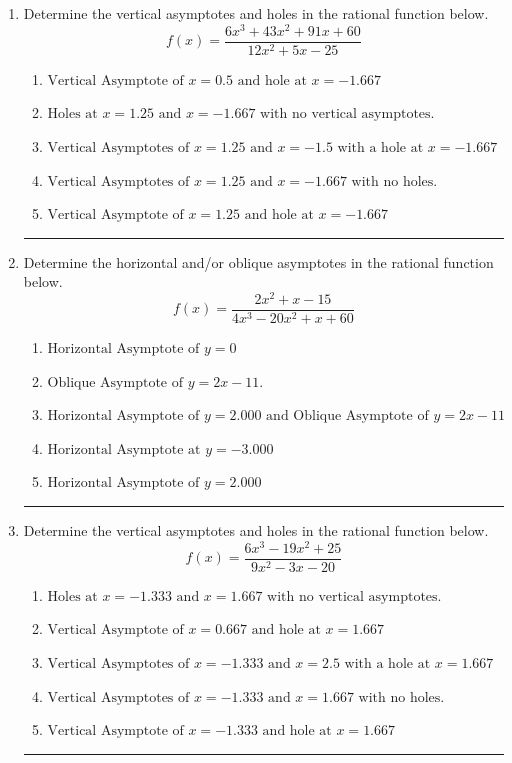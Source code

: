 \documentclass[14pt]{extbook}
\newcommand{\litem}[1]{\item#1\hspace*{-1cm}\rule{\textwidth}{0.4pt}}
\begin{document}
\begin{enumerate}
{\begin{enumerate}[label=\Alph*.]
\end{enumerate} }
\litem{
Determine the vertical asymptotes and holes in the rational function below.\[ f(x) = \frac{6x^{3} +43 x^{2} +91 x + 60}{12x^{2} +5 x -25} \]\begin{enumerate}[label=\Alph*.]
\item \( \text{Vertical Asymptote of } x = 0.5 \text{ and hole at } x = -1.667 \)
\item \( \text{Holes at } x = 1.25 \text{ and } x = -1.667 \text{ with no vertical asymptotes.} \)
\item \( \text{Vertical Asymptotes of } x = 1.25 \text{ and } x = -1.5 \text{ with a hole at } x = -1.667 \)
\item \( \text{Vertical Asymptotes of } x = 1.25 \text{ and } x = -1.667 \text{ with no holes.} \)
\item \( \text{Vertical Asymptote of } x = 1.25 \text{ and hole at } x = -1.667 \)

\end{enumerate} }
\litem{
Determine the horizontal and/or oblique asymptotes in the rational function below.\[ f(x) = \frac{2x^{2} +x -15}{4x^{3} -20 x^{2} +x + 60} \]\begin{enumerate}[label=\Alph*.]
\item \( \text{Horizontal Asymptote of } y = 0 \)
\item \( \text{Oblique Asymptote of } y = 2x -11. \)
\item \( \text{Horizontal Asymptote of } y = 2.000 \text{ and Oblique Asymptote of } y = 2x -11 \)
\item \( \text{Horizontal Asymptote at } y = -3.000 \)
\item \( \text{Horizontal Asymptote of } y = 2.000  \)

\end{enumerate} }
\litem{
Determine the vertical asymptotes and holes in the rational function below.\[ f(x) = \frac{6x^{3} -19 x^{2} + 25}{9x^{2} -3 x -20} \]\begin{enumerate}[label=\Alph*.]
\item \( \text{Holes at } x = -1.333 \text{ and } x = 1.667 \text{ with no vertical asymptotes.} \)
\item \( \text{Vertical Asymptote of } x = 0.667 \text{ and hole at } x = 1.667 \)
\item \( \text{Vertical Asymptotes of } x = -1.333 \text{ and } x = 2.5 \text{ with a hole at } x = 1.667 \)
\item \( \text{Vertical Asymptotes of } x = -1.333 \text{ and } x = 1.667 \text{ with no holes.} \)
\item \( \text{Vertical Asymptote of } x = -1.333 \text{ and hole at } x = 1.667 \)


\end{enumerate}}
\end{enumerate}
\end{document}
